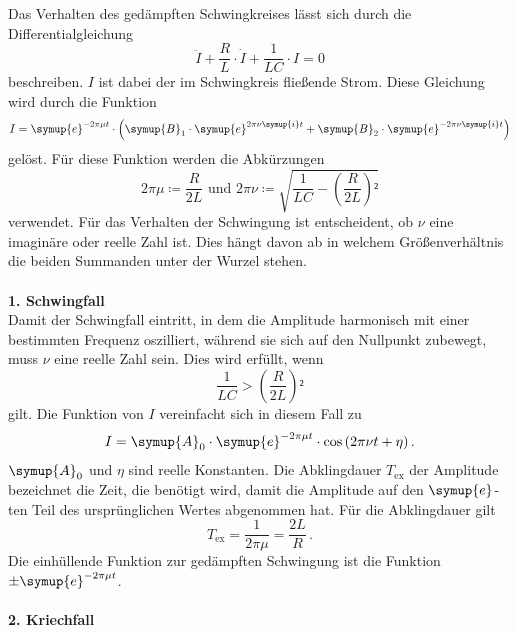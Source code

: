 Das Verhalten des gedämpften Schwingkreises lässt sich durch die Differentialgleichung 
\begin{equation}
    \ddot{I} + \frac{R}{L} \cdot \dot{I} + \frac{1}{L C} \cdot I = 0 
\end{equation}
beschreiben. $I$ ist dabei der im Schwingkreis fließende Strom. 
Diese Gleichung wird durch die Funktion  
\begin{equation}
    I = \symup{e}^{-2\pi\mu t} \cdot \left(\symup{B}_1 \cdot \symup{e}^{2\pi\nu \symup{i}t}  + \symup{B}_2 \cdot \symup{e}^{- 2\pi\nu \symup{i}t} \right)
\end{equation}
gelöst. Für diese Funktion werden die Abkürzungen 
\begin{equation*}
2 \pi \mu \coloneqq \frac{R}{2 L}  \,\,\text{und}\,\, 2 \pi \nu \coloneqq \sqrt{\frac{1}{LC} - \left(\frac{R}{2L}\right)²}
\end{equation*}
verwendet. Für das Verhalten der Schwingung ist entscheident, ob $\nu$ eine imaginäre
oder reelle Zahl ist. Dies hängt davon ab in welchem Größenverhältnis die beiden 
Summanden unter der Wurzel stehen. \\
\\
\textbf{1. Schwingfall}\\
Damit der Schwingfall eintritt, in dem die Amplitude harmonisch mit einer bestimmten Frequenz 
oszilliert, während sie sich auf den 
Nullpunkt zubewegt, muss $\nu$ eine reelle Zahl sein. Dies wird erfüllt, wenn 
\begin{equation*}
    \frac{1}{LC} > \left(\frac{R}{2L}\right)² 
\end{equation*}
gilt. Die Funktion von $I$ vereinfacht sich in diesem Fall zu
\begin{equation}
    I = \symup{A}_0 \cdot \symup{e}^{-2\pi\mu t} \cdot \cos{ \left(2\pi\nu t + \eta\right)} \, .
\end{equation}
$\symup{A}_0$ und $\eta$ sind reelle Konstanten. Die Abklingdauer $T_{\text{ex}}$ der Amplitude bezeichnet
die Zeit, die benötigt wird, damit die Amplitude auf den $\symup{e}$-ten Teil des 
ursprünglichen Wertes abgenommen hat. Für die Abklingdauer gilt
\begin{equation}
    T_{\text{ex}} = \frac{1}{2\pi\mu} = \frac{2 L}{R} \, .
    \label{eqn:Abklingzeit}
\end{equation}
Die einhüllende Funktion zur gedämpften Schwingung ist die Funktion $\pm \symup{e}^{-2\pi\mu t}$. \\
\\
\textbf{2. Kriechfall}\\
